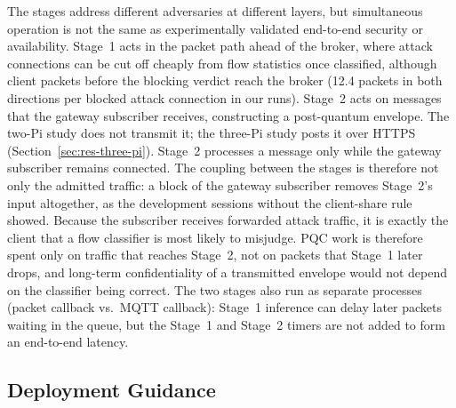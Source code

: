 \documentclass[journal]{IEEEtran}
\begin{document}
The stages address different adversaries at different layers, but simultaneous operation is not the same as experimentally validated end-to-end security or availability. Stage~1 acts in the packet path ahead of the broker, where attack connections can be cut off cheaply from flow statistics once classified, although client packets before the blocking verdict reach the broker (12.4 packets in both directions per blocked attack connection in our runs). Stage~2 acts on messages that the gateway subscriber receives, constructing a post-quantum envelope. The two-Pi study does not transmit it; the three-Pi study posts it over HTTPS (Section~\ref{sec:res-three-pi}). Stage~2 processes a message only while the gateway subscriber remains connected. The coupling between the stages is therefore not only the admitted traffic: a block of the gateway subscriber removes Stage~2's input altogether, as the development sessions without the client-share rule showed. Because the subscriber receives forwarded attack traffic, it is exactly the client that a flow classifier is most likely to misjudge. PQC work is therefore spent only on traffic that reaches Stage~2, not on packets that Stage~1 later drops, and long-term confidentiality of a transmitted envelope would not depend on the classifier being correct. The two stages also run as separate processes (packet callback vs.\ MQTT callback): Stage~1 inference can delay later packets waiting in the queue, but the Stage~1 and Stage~2 timers are not added to form an end-to-end latency.

\subsection{Deployment Guidance}
\end{document}

